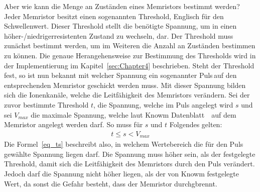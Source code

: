   Aber wie kann die Menge an Zuständen eines Memristors bestimmt werden? Jeder Memristor besitzt einen sogenannten \glqq Threshold\grqq, Englisch für den \glqq Schwellenwert\grqq. Dieser Threshold stellt die benötigte Spannung, um in einen höher-/niedrigerresistenten Zustand zu wechseln, dar. Der Threshold muss zunächst bestimmt werden, um im Weiteren die Anzahl an Zuständen bestimmen zu können. Die genaue Herangehensweise zur Bestimmung des Thresholds wird in der Implementierung im Kapitel~\ref{sec:Chapter4} beschrieben. Steht der Threshold fest, so ist nun bekannt mit welcher Spannung ein sogenannter \glqq Puls\grqq\,auf den entsprechenden Memristor geschickt werden muss. Mit dieser Spannung bilden sich die Ionenkanäle, welche die Leitfähigkeit des Memristors verändern. Sei der zuvor bestimmte Threshold $t$, die Spannung, welche im Puls angelegt wird $s$ und sei $V_{max}$ die maximale Spannung, welche laut Knowm Datenblatt~\cite{knowm_comp_2019}~auf dem Memristor angelegt werden darf. So muss für $s$ und $t$ Folgendes gelten:
  \begin{align}
    t \leq s < V_{max} \label{eq_ts}
  \end{align}
  Die Formel~\ref{eq_ts} beschreibt also, in welchem Wertebereich die für den Puls gewählte Spannung liegen darf. Die Spannung muss höher sein, als der festgelegte Threshold, damit sich die Leitfähigkeit des Memristors durch den Puls verändert. Jedoch darf die Spannung nicht höher liegen, als der von Knowm festgelegte Wert, da sonst die Gefahr besteht, dass der Memristor durchgbrennt.


